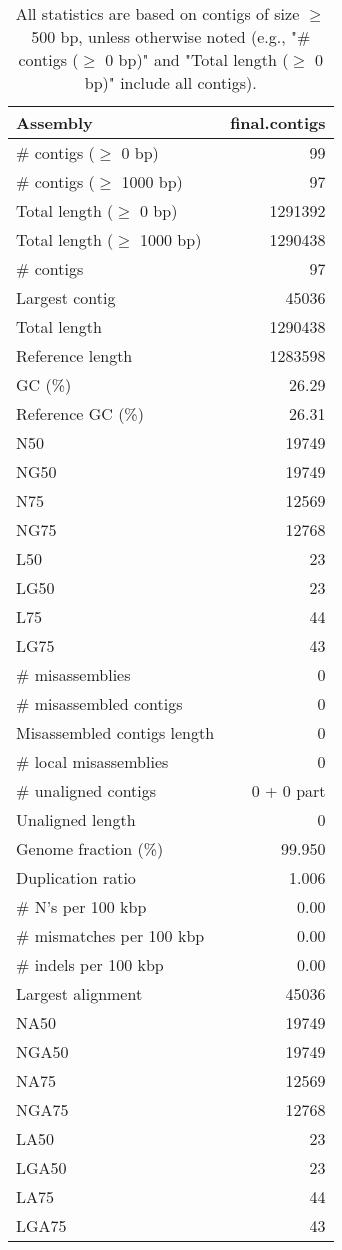 \documentclass[12pt,a4paper]{article}
\begin{document}
\begin{table}[ht]
\begin{center}
\caption{All statistics are based on contigs of size $\geq$ 500 bp, unless otherwise noted (e.g., "\# contigs ($\geq$ 0 bp)" and "Total length ($\geq$ 0 bp)" include all contigs).}
\begin{tabular}{|l*{1}{|r}|}
\hline
Assembly & final.contigs \\ \hline
\# contigs ($\geq$ 0 bp) & 99 \\ \hline
\# contigs ($\geq$ 1000 bp) & 97 \\ \hline
Total length ($\geq$ 0 bp) & 1291392 \\ \hline
Total length ($\geq$ 1000 bp) & 1290438 \\ \hline
\# contigs & 97 \\ \hline
Largest contig & 45036 \\ \hline
Total length & 1290438 \\ \hline
Reference length & 1283598 \\ \hline
GC (\%) & 26.29 \\ \hline
Reference GC (\%) & 26.31 \\ \hline
N50 & 19749 \\ \hline
NG50 & 19749 \\ \hline
N75 & 12569 \\ \hline
NG75 & 12768 \\ \hline
L50 & 23 \\ \hline
LG50 & 23 \\ \hline
L75 & 44 \\ \hline
LG75 & 43 \\ \hline
\# misassemblies & 0 \\ \hline
\# misassembled contigs & 0 \\ \hline
Misassembled contigs length & 0 \\ \hline
\# local misassemblies & 0 \\ \hline
\# unaligned contigs & 0 + 0 part \\ \hline
Unaligned length & 0 \\ \hline
Genome fraction (\%) & 99.950 \\ \hline
Duplication ratio & 1.006 \\ \hline
\# N's per 100 kbp & 0.00 \\ \hline
\# mismatches per 100 kbp & 0.00 \\ \hline
\# indels per 100 kbp & 0.00 \\ \hline
Largest alignment & 45036 \\ \hline
NA50 & 19749 \\ \hline
NGA50 & 19749 \\ \hline
NA75 & 12569 \\ \hline
NGA75 & 12768 \\ \hline
LA50 & 23 \\ \hline
LGA50 & 23 \\ \hline
LA75 & 44 \\ \hline
LGA75 & 43 \\ \hline
\end{tabular}
\end{center}
\end{table}
\end{document}
